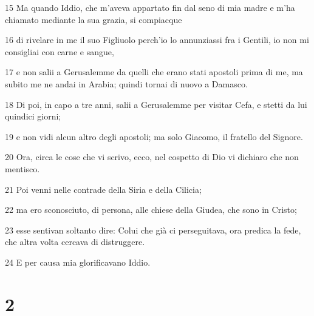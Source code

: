 \par 15 Ma quando Iddio, che m'aveva appartato fin dal seno di mia madre e m'ha chiamato mediante la sua grazia, si compiacque
\par 16 di rivelare in me il suo Figliuolo perch'io lo annunziassi fra i Gentili, io non mi consigliai con carne e sangue,
\par 17 e non salii a Gerusalemme da quelli che erano stati apostoli prima di me, ma subito me ne andai in Arabia; quindi tornai di nuovo a Damasco.
\par 18 Di poi, in capo a tre anni, salii a Gerusalemme per visitar Cefa, e stetti da lui quindici giorni;
\par 19 e non vidi alcun altro degli apostoli; ma solo Giacomo, il fratello del Signore.
\par 20 Ora, circa le cose che vi scrivo, ecco, nel cospetto di Dio vi dichiaro che non mentisco.
\par 21 Poi venni nelle contrade della Siria e della Cilicia;
\par 22 ma ero sconosciuto, di persona, alle chiese della Giudea, che sono in Cristo;
\par 23 esse sentivan soltanto dire: Colui che già ci perseguitava, ora predica la fede, che altra volta cercava di distruggere.
\par 24 E per causa mia glorificavano Iddio.

\chapter{2}

